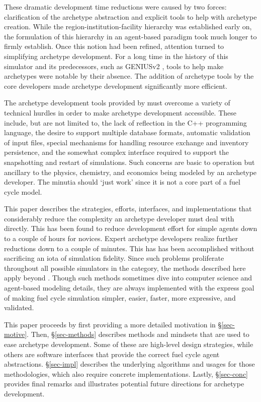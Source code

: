 These dramatic development time reductions were caused by two forces:
clarification of the archetype abstraction and explicit tools to help with 
archetype creation. While the region-institution-facility hierarchy was established 
early on, the formulation of this hierarchy in an agent-based paradigm took much 
longer to firmly establish.  Once this notion had been refined, attention turned to 
simplifying \Cyclus archetype development.
For a long time in the history of this simulator and its predecessors, such as 
\gls{GENIUSv2} \cite{oliver_studying_2009}, tools to help make archetypes were notable by their 
absence. 
The addition of archetype tools by the \cyclus core developers made archetype
development significantly more efficient.

The archetype development tools provided by \cyclus must overcome a variety of 
technical hurdles in order to make archetype development accessible.  These 
include, but are not limited to, the lack of reflection in the C++ programming language,
the desire to support multiple database formats, automatic validation of input files,
special mechanisms for handling resource exchange and inventory persistence, 
and the somewhat complex interface required to support the snapshotting and 
restart of simulations. Such concerns are basic to \cyclus operation but 
ancillary to the physics, chemistry, and economics being modeled by an 
archetype developer.
The minutia should `just work' since it is not a core part of a fuel cycle model.

This paper describes the strategies, efforts, interfaces,
and implementations that considerably reduce the complexity  
an archetype developer must deal with directly. This has been 
found to reduce development effort for simple agents down to a couple 
of hours for novices. Expert archetype developers realize further 
reductions down to a couple of minutes. This has has been accomplished 
without sacrificing an iota of simulation fidelity. Since such 
problems proliferate throughout all possible simulators in 
the \cyclus category, the methods described here apply beyond \cyclus.
Though such methods sometimes dive into 
computer science and agent-based modeling details, they are always implemented
with the express goal of making fuel cycle simulation 
simpler, easier, faster, more expressive, and validated.

This paper proceeds by first providing a more detailed motivation 
in \S \ref{sec-motive}. Then, \S \ref{sec-methods} describes
methods and mindsets that are used to ease archetype development.
Some of these are high-level design strategies, while others are software 
interfaces that 
provide the correct fuel cycle agent abstractions. 
\S \ref{sec-impl} describes the underlying algorithms and usages
for those methodologies, which also require concrete implementations.
Lastly, \S \ref{sec-conc} provides final remarks and illustrates
potential future directions for \cyclus archetype development.
